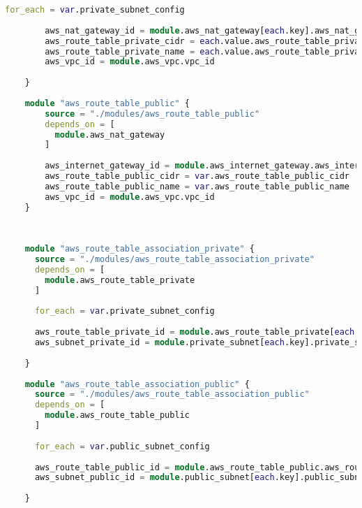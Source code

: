 \begin{lstlisting}[language=terraform]
        for_each = var.private_subnet_config
    
        aws_nat_gateway_id = module.aws_nat_gateway[each.key].aws_nat_gateway_id
        aws_route_table_private_cidr = each.value.aws_route_table_private_cidr
        aws_route_table_private_name = each.value.aws_route_table_private_name
        aws_vpc_id = module.aws_vpc.vpc_id
      
    }
    
    module "aws_route_table_public" {
        source = "./modules/aws_route_table_public"
        depends_on = [
          module.aws_nat_gateway
        ]
    
        aws_internet_gateway_id = module.aws_internet_gateway.aws_internet_gateway_id
        aws_route_table_public_cidr = var.aws_route_table_public_cidr
        aws_route_table_public_name = var.aws_route_table_public_name
        aws_vpc_id = module.aws_vpc.vpc_id
    }
    
    
    
    module "aws_route_table_association_private" {
      source = "./modules/aws_route_table_association_private"
      depends_on = [
        module.aws_route_table_private
      ]
    
      for_each = var.private_subnet_config
    
      aws_route_table_private_id = module.aws_route_table_private[each.key].aws_route_table_private_id
      aws_subnet_private_id = module.private_subnet[each.key].private_subnet_id
    
    }
    
    module "aws_route_table_association_public" {
      source = "./modules/aws_route_table_association_public"
      depends_on = [
        module.aws_route_table_public
      ]
    
      for_each = var.public_subnet_config
    
      aws_route_table_public_id = module.aws_route_table_public.aws_route_table_public_id
      aws_subnet_public_id = module.public_subnet[each.key].public_subnet_id
      
    }
\end{lstlisting}



